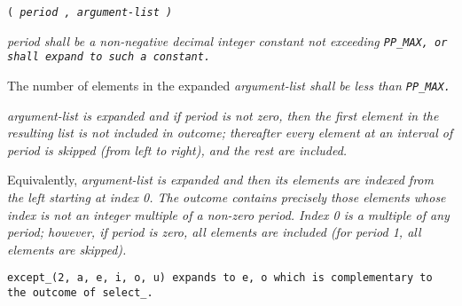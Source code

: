 
 \tt{(} \it{period} \tt{,} \it{argument-list} \tt{)}


\it{period} shall be a non-negative decimal integer  constant
not exceeding \tt{PP_MAX}, or shall expand to such a constant.

The number of elements in the expanded
\it{argument-list} shall be less than \tt{PP_MAX}.


\it{argument-list} is expanded and if \it{period} is not zero, then
the first element in the resulting list is not included in outcome;
thereafter every element at an interval of \it{period} is
skipped (from left to right), and the rest are included.

Equivalently, \it{argument-list} is expanded and then its
elements are indexed from the left starting at index 0.
The outcome contains precisely those elements whose
index is not an integer multiple of a non-zero \it{period}.
Index 0 is a multiple of any \it{period}; however, if \it{period} is zero,
all elements are included (for \it{period} 1, all elements are skipped).

\example \tt{except_(2, a, e, i, o, u)} expands to \tt{e, o}
which is complementary to the outcome of \tt{select_}.

